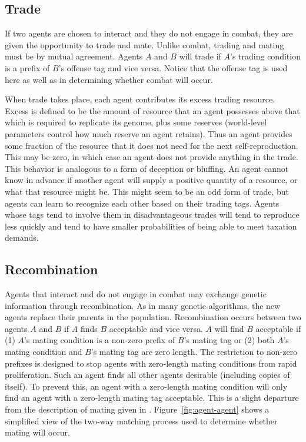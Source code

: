 \subsection{Trade}
\label{dynamics:trade}

If two agents are chosen to interact and they do not engage in combat,
they are given the opportunity to trade and mate. Unlike combat,
trading and mating must be by mutual agreement. Agents $A$ and $B$
will trade if $A$'s trading condition is a prefix of $B$'s offense tag
and vice versa. Notice that the offense tag is used here as well as in
determining whether combat will occur.

When trade takes place, each agent contributes its excess trading
resource.  Excess is defined to be the amount of resource that an
agent possesses above that which is required to replicate its genome,
plus some reserves (world-level parameters control how much reserve an
agent retains).  Thus an agent provides some fraction of the resource
that it does not need for the next self-reproduction. This may be
zero, in which case an agent does not provide anything in the
trade. This behavior is analogous to a form of deception or bluffing.
An agent cannot know in advance if another agent will supply a
positive quantity of a resource, or what that resource might be. This
might seem to be an odd form of trade, but agents can learn to
recognize each other based on their trading tags. Agents whose tags
tend to involve them in disadvantageous trades will tend to reproduce
less quickly and tend to have smaller probabilities of being able to
meet taxation demands.

\subsection{Recombination}

Agents that interact and do not engage in combat may exchange genetic
information through recombination.  As in many genetic algorithms, the
new agents replace their parents in the population.  Recombination
occurs between two agents $A$ and $B$ if $A$ finds $B$ acceptable and
vice versa. $A$ will find $B$ acceptable if (1) $A$'s mating
condition is a non-zero prefix of $B$'s mating tag or (2) both $A$'s
mating condition and $B$'s mating tag are zero length. The restriction
to non-zero prefixes is designed to stop agents with zero-length
mating conditions from rapid proliferation. Such an agent finds all
other agents desirable (including copies of itself). To prevent this,
an agent with a zero-length mating condition will only find an agent
with a zero-length mating tag acceptable. This is a slight departure
from the description of mating given in
\cite{Holland92}.  Figure~\ref{fig:agent-agent} shows a simplified
view of the two-way matching process used to determine whether mating
will occur.

